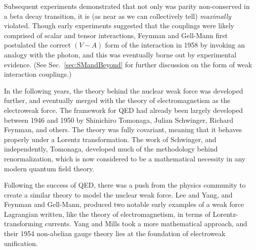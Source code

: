 Subsequent experiments demonstrated that not only was parity non-conserved in a beta decay transition, it is (as near as we can collectively tell) \emph{maximally} violated.  
Though early experiments suggested that the couplings were likely comprised of 
scalar and tensor interactions, Feynman and Gell-Mann first postulated the correct $(V-A)$ form of the interaction in 1958 by invoking an analogy with the photon, and this was eventually borne out by experimental evidence\cite{FeynmanGellMann1958}.  (See Sec.~\ref{sec:SMandBeyond} for further discussion on the form of weak interaction couplings.)

In the following years, the theory behind the nuclear weak force was developed further, and eventually merged with the theory of electromagnetism as the electroweak force.  The framework for \ac{QED} had already been largely developed between 1946 and 1950 by Shinichiro Tomonaga, Julian Schwinger, Richard Feynman, and others.  The theory was fully covariant, meaning that it behaves properly under a Lorentz transformation.  The work of Schwinger, and independently, Tomonaga, developed much of the methodology behind renormalization, which is now considered to be a mathematical necessity in any modern quantum field theory\cite{tomonaga1946}\cite{schwinger1948covariant}\cite{feynman1949spacetime}\cite{feynman1949positrons}\cite{feynman1950}\cite{dyson1949theories}.  ~



Following the success of QED, there was a push from the physics community to create a similar theory to model the nuclear weak force.  
%
Lee and Yang, and Feynman and Gell-Mann, produced two notable early examples of a weak force Lagrangian written, like the theory of electromagnetism, in terms of Lorentz-transforming currents\cite{LeeYang}\cite{FeynmanGellMann1958}.  Yang and Mills took a more mathematical approach, and their 1954 non-abelian gauge theory \cite{YangMills1954} lies at the foundation of electroweak unification.  
%

